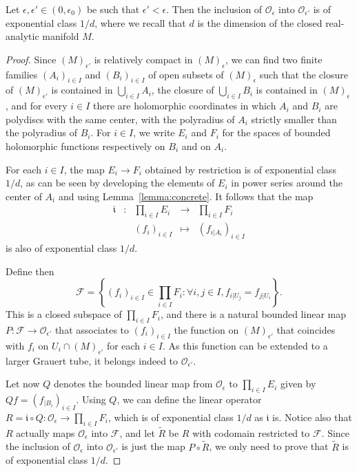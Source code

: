 \documentclass[AHL,Unicode,longabstracts,published]{cedram}
\newcommand{\set}[1]{\left\{ #1 \right\}}
\newcommand{\clO}{\mathcal{O}}
\newcommand{\clF}{\mathcal{F}}
\newcommand{\fki}{\mathfrak{i}}
\let\oldforall\forall
\renewcommand*{\forall}{\mathrel{\oldforall}}
\newcommand{\clO}{\mathcal{O}}
\begin{document}
\begin{lemm}\label{lemma:exponential_inclusion}
Let $\epsilon,\epsilon' \in (0,\epsilon_0)$ be such that $\epsilon' < \epsilon$. Then the inclusion of $\clO_\epsilon$ into $\clO_{\epsilon'}$ is of exponential class $1/d$, where we recall that $d$ is the dimension of the closed real-analytic manifold $M$.
\end{lemm}

\begin{proof}
Since $(M)_{\epsilon'}$ is relatively compact in $(M)_\epsilon$, we can find two finite families $(A_i)_{i \in I}$ and $(B_i)_{i \in I}$ of open subsets of $(M)_\epsilon$ such that the closure of $(M)_{\epsilon'}$ is contained in $\bigcup_{i \in I} A_i$, the closure of $\bigcup_{i \in I} B_i$ is contained in $(M)_\epsilon$, and for every $i \in I$ there are holomorphic coordinates in which $A_i$ and $B_i$ are polydiscs with the same center, with the polyradius of $A_i$ strictly smaller than the polyradius of $B_i$. For $i \in I$, we write $E_i$ and $F_i$ for the spaces of bounded holomorphic functions respectively on $B_i$ and on $A_i$.

For each $i \in I$, the map $E_i \to F_i$ obtained by restriction is of exponential class $1/d$, as can be seen by developing the elements of $E_i$ in power series around the center of $A_i$ and using Lemma~\ref{lemma:concrete}. It follows that the map
\begin{equation*}
\begin{array}{ccccc}
\fki & : & \prod_{i \in I} E_i& \to & \prod_{i \in I} F_i \\
& & (f_i)_{i \in I} & \mapsto & (f_{i|A_i})_{i \in I}
\end{array}
\end{equation*}
is also of exponential class $1/d$.

Define then
\begin{equation*}
\clF = \set{ (f_i)_{i \in I} \in \prod_{i \in I} F_i: \forall i,j \in I, f_{i|U_j} = f_{j|U_i}}.
\end{equation*}
This is a closed subspace of $\prod_{i \in I} F_i$, and there is a natural bounded linear map $P : \clF \to \clO_{\epsilon'}$ that associates to $(f_i)_{i \in I}$ the function on $(M)_{\epsilon'}$ that coincides with $f_i$ on $U_i \cap(M)_{\epsilon'}$ for each $i \in I$. As this function can be extended to a larger Grauert tube, it belongs indeed to $\clO_{\epsilon'}$.

Let now $Q$ denotes the bounded linear map from $\clO_{\epsilon}$ to $\prod_{i \in I} E_i$ given by $Qf = (f_{|B_i})_{i \in I}$. Using $Q$, we can define the linear operator $R = \fki \circ Q : \clO_\epsilon \to \prod_{i \in I} F_i$, which is of exponential class $1/d$ as $\fki $ is. Notice also that $R$ actually maps $\clO_\epsilon$ into $\clF$, and let $\widetilde{R}$ be $R$ with codomain restricted to $\clF$. Since the inclusion of $\clO_\epsilon$ into $\clO_{\epsilon'}$ is just the map $P \circ \widetilde{R}$, we only need to prove that $\widetilde{R}$ is of exponential class $1/d$.


\end{proof}
\end{document}
